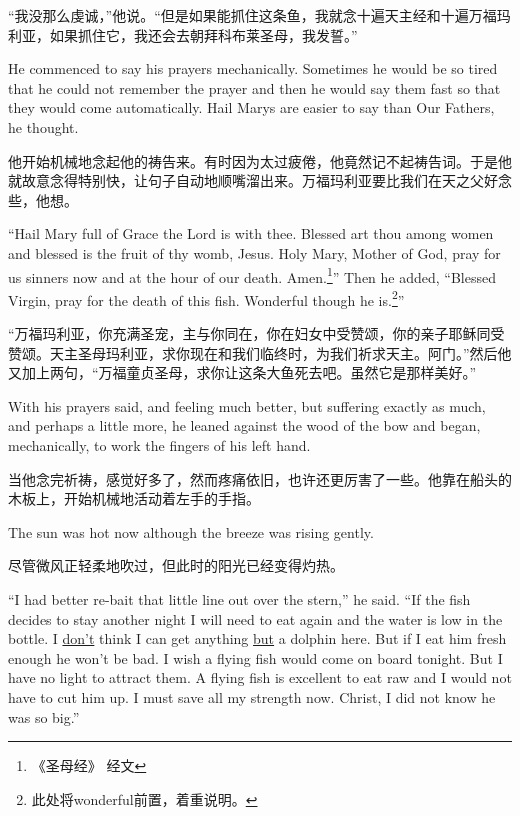 \begin{paracol}{2}
\switchcolumn

“我没那么虔诚，”他说。“但是如果能抓住这条鱼，我就念十遍天主经和十遍万福玛利亚，如果抓住它，我还会去朝拜科布莱圣母，我发誓。”

\switchcolumn*

He commenced to say his \glspl{prayer} \gls{mechanically}. Sometimes he
would be so tired that he could not remember the prayer and then he would
say them fast so that they would come automatically. Hail Marys are easier
to say than Our Fathers, he thought.

\switchcolumn

他开始机械地念起他的祷告来。有时因为太过疲倦，他竟然记不起祷告词。于是他就故意念得特别快，让句子自动地顺嘴溜出来。万福玛利亚要比我们在天之父好念些，他想。

\switchcolumn*

``Hail Mary full of Grace the Lord is with thee. Blessed art thou among
women and blessed is the fruit of thy womb, Jesus. Holy Mary, Mother of God,
pray for us sinners now and at the hour of our death. Amen.\footnote{《圣母经》
  经文}'' Then he added, ``Blessed Virgin, pray for the death of this fish.
Wonderful though he is.\footnote{此处将wonderful前置，着重说明。}''

\switchcolumn

“万福玛利亚，你充满圣宠，主与你同在，你在妇女中受赞颂，你的亲子耶稣同受赞颂。天主圣母玛利亚，求你现在和我们临终时，为我们祈求天主。阿门。”然后他又加上两句，“万福童贞圣母，求你让这条大鱼死去吧。虽然它是那样美好。”

\switchcolumn*

With his prayers said, and feeling much better, but suffering exactly as
much, and perhaps a little more, he leaned against the wood of the bow and
began, mechanically, to work the fingers of his left hand.

\switchcolumn

当他念完祈祷，感觉好多了，然而疼痛依旧，也许还更厉害了一些。他靠在船头的木板上，开始机械地活动着左手的手指。

\switchcolumn*

The sun was hot now although the breeze was rising gently.

\switchcolumn

尽管微风正轻柔地吹过，但此时的阳光已经变得灼热。

\switchcolumn*

``I had better re-bait that little line out over the stern,'' he said. ``If
the fish decides to stay another night I will need to eat again and the
water is low in the bottle. I \uline{don't} think I can get anything
\uline{but} a dolphin here. But if I eat him fresh enough he won't be bad. I
wish a flying fish would come on board tonight. But I have no light to
\gls{attract} them. A flying fish is excellent to eat raw and I would not
have to cut him up. I must save all my strength now. Christ, I did not know
he was so big.''


\end{paracol}

